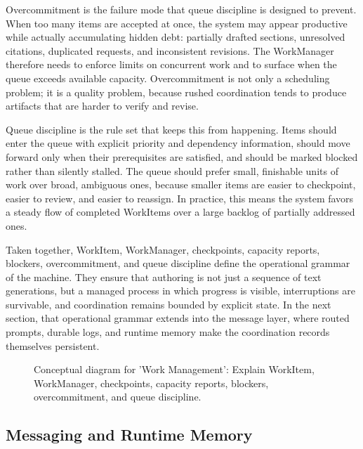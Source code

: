\documentclass[11pt]{article}
\begin{document}
Overcommitment is the failure mode that queue discipline is designed to prevent. When too many items are accepted at once, the system may appear productive while actually accumulating hidden debt: partially drafted sections, unresolved citations, duplicated requests, and inconsistent revisions. The WorkManager therefore needs to enforce limits on concurrent work and to surface when the queue exceeds available capacity. Overcommitment is not only a scheduling problem; it is a quality problem, because rushed coordination tends to produce artifacts that are harder to verify and revise.

Queue discipline is the rule set that keeps this from happening. Items should enter the queue with explicit priority and dependency information, should move forward only when their prerequisites are satisfied, and should be marked blocked rather than silently stalled. The queue should prefer small, finishable units of work over broad, ambiguous ones, because smaller items are easier to checkpoint, easier to review, and easier to reassign. In practice, this means the system favors a steady flow of completed WorkItems over a large backlog of partially addressed ones.

Taken together, WorkItem, WorkManager, checkpoints, capacity reports, blockers, overcommitment, and queue discipline define the operational grammar of the machine. They ensure that authoring is not just a sequence of text generations, but a managed process in which progress is visible, interruptions are survivable, and coordination remains bounded by explicit state. In the next section, that operational grammar extends into the message layer, where routed prompts, durable logs, and runtime memory make the coordination records themselves persistent.

\begin{figure}[htbp]
\centering

\caption{Conceptual diagram for 'Work Management': Explain WorkItem, WorkManager, checkpoints, capacity reports, blockers, overcommitment, and queue discipline.}
\end{figure}



\subsection{Messaging and Runtime Memory}

\end{document}
